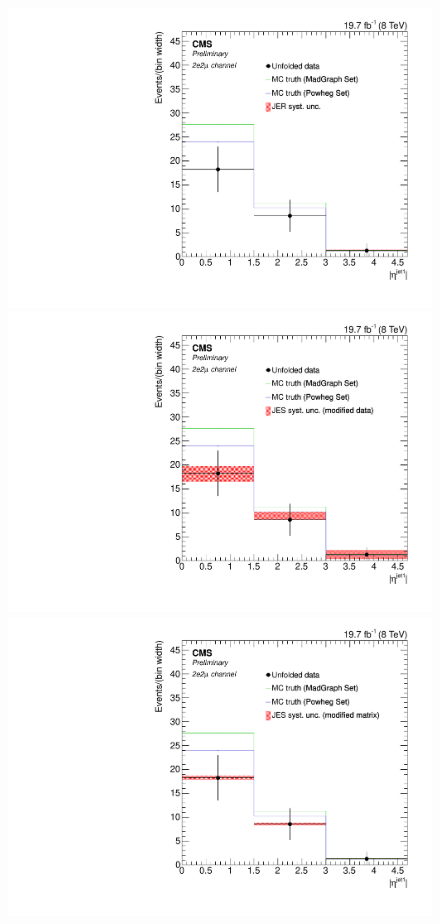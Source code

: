 \begin{figure}[hbtp]
\begin{center}
   \includegraphics[width=0.8\cmsFigWidth]{Figures/Unfolding/Systematics/ZZTo2e2m_EtaJet1_JER_Mad_fr}
   \includegraphics[width=0.8\cmsFigWidth]{Figures/Unfolding/Systematics/ZZTo2e2m_EtaJet1_JES_ModData_Mad_fr}     
   \includegraphics[width=0.8\cmsFigWidth]{Figures/Unfolding/Systematics/ZZTo2e2m_EtaJet1_JES_ModMat_Mad_fr}

\end{center}
\end{figure}
